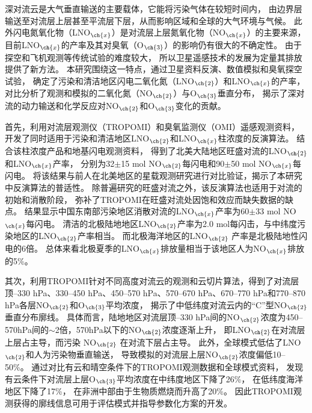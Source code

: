 
\abstract
{
深对流云是大气垂直输送的主要载体，它能将污染气体在较短时间内，
由边界层输送至对流层上层甚至平流层下层，从而影响区域和全球的大气环境与气候。
此外闪电氮氧化物（LNO$_{\ch{x}}$）是对流层上层氮氧化物（NO$_{\ch{x}}$）的主要来源，目前LNO$_{\ch{x}}$的产率及其对臭氧（O$_{\ch{3}}$）的影响仍有很大的不确定性。
由于探空和飞机观测等传统试验的难度较大，
所以卫星遥感技术的发展为定量其排放提供了新方法。
本研究围绕这一特点，通过卫星资料反演、数值模拟和臭氧探空试验，
确定了污染和清洁地区闪电二氧化氮（LNO$_{\ch{2}}$）和LNO$_{\ch{x}}$的产率，
对比分析了观测和模拟的二氧化氮（NO$_{\ch{2}}$）与O$_{\ch{3}}$垂直分布，
揭示了深对流的动力输送和化学反应对NO$_{\ch{2}}$和O$_{\ch{3}}$变化的贡献。

首先，利用对流层观测仪（TROPOMI）和臭氧监测仪（OMI）遥感观测资料，
开发了同时适用于污染和清洁地区LNO$_{\ch{2}}$和LNO$_{\ch{x}}$柱浓度的反演算法。
结合该柱浓度产品和地基闪电观测资料，
得到了北美大陆地区旺盛对流的LNO$_{\ch{2}}$和LNO$_{\ch{x}}$产率，
分别为32$\pm$15 mol NO$_{\ch{2}}$每闪电和90$\pm$50 mol NO$_{\ch{x}}$每闪电。
将该结果与前人在北美地区的星载观测研究进行对比验证，揭示了本研究中反演算法的普适性。
除普遍研究的旺盛对流之外，该反演算法也适用于对流的初始和消散阶段，
弥补了TROPOMI在旺盛对流处因饱和效应而缺失数据的缺点。
结果显示中国东南部污染地区消散对流的LNO$_{\ch{x}}$产率为60$\pm$33 mol NO$_{\ch{x}}$每闪电。
清洁的北极陆地地区LNO$_{\ch{2}}$产率为2.0 mol每闪击，与中纬度污染地区的LNO$_{\ch{2}}$产率相当。
而北极海洋地区的LNO$_{\ch{2}}$ 产率是北极陆地性闪电的6倍。
总体来看北极夏季的LNO$_{\ch{x}}$排放量相当于该地区人为NO$_{\ch{x}}$排放的5\%。

其次，利用TROPOMI针对不同高度对流云的观测和云切片算法，得到了对流层顶--330 hPa、330--450 hPa、450--570 hPa、570--670 hPa、670--770 hPa和770--870 hPa各层NO$_{\ch{2}}$和O$_{\ch{3}}$平均浓度，
揭示了中低纬度对流云内的“C”型NO$_{\ch{2}}$垂直分布廓线。
具体而言，陆地地区对流层顶--330 hPa间的NO$_{\ch{2}}$浓度为450--570hPa间的$\sim$2倍，570hPa以下的NO$_{\ch{2}}$浓度逐渐上升，
即LNO$_{\ch{2}}$在对流层上层占主导，而污染 NO$_{\ch{2}}$ 在对流下层占主导。
此外，全球模式低估了LNO$_{\ch{2}}$和人为污染物垂直输送，
导致模拟的对流层上层NO$_{\ch{2}}$浓度偏低10--50\%。
通过对比有云和晴空条件下的TROPOMI观测数据和全球模式资料，
发现有云条件下对流层上层O$_{\ch{3}}$平均浓度在中纬度地区下降了26\%，
在低纬度海洋地区下降了17\%，
在非洲中部由于生物质燃烧而升高了20\%。
因此TROPOMI观测获得的廓线信息可用于评估模式并指导参数化方案的开发。

}
